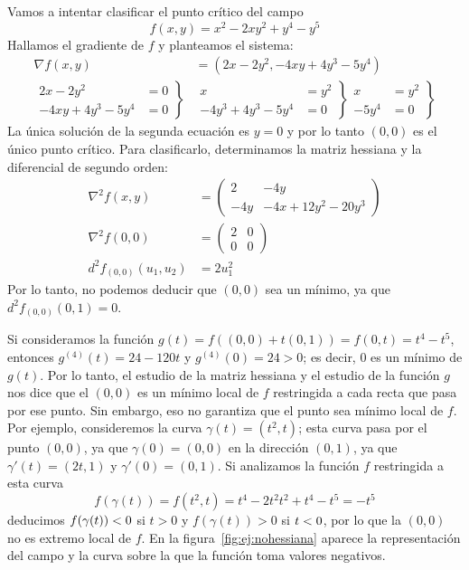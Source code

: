 \begin{ejemplo}\label{ej:nohessiana}
Vamos a intentar clasificar el punto crítico del campo
\[
f(x,y)=x^2-2xy^2+y^4-y^5
\]
Hallamos el gradiente de $f$ y planteamos el sistema:
\begin{align*}
\nabla f(x,y) & = (2x-2y^2,-4xy+4y^3-5y^4) \\[1em]
\left.\begin{array}{rl}
2x-2y^2 & = 0\\
-4xy+4y^3-5y^4 & =0 
\end{array}\right\} & 
\left.\begin{array}{rl}
x & = y^2\\
-4y^3+4y^3-5y^4 & =0
\end{array}\right\}
\left.\begin{array}{rl}
x & = y^2\\
-5y^4 & =0
\end{array}\right\}
\end{align*}
La única solución de la segunda ecuación es $y=0$ y por lo tanto $(0,0)$ es el único punto crítico.
Para clasificarlo, determinamos la matriz hessiana y la diferencial de segundo orden:
%
\begin{align*}
\nabla^2f(x,y) &=
\begin{pmatrix}
2 & -4y \\
-4y & -4x+12y^2-20y^3
\end{pmatrix}\\
\nabla^2f(0,0) &=
\begin{pmatrix}
2 & 0 \\
0 & 0
\end{pmatrix}\\
d^2f_{(0,0)}(u_1,u_2) &= 2u_1^2
\end{align*}
Por lo tanto, no podemos deducir que $(0,0)$ sea un mínimo, ya que
$d^2f_{(0,0)}(0,1)=0$.

Si consideramos la función $g(t)=f((0,0)+t(0,1))=f(0,t)=t^4-t^5$,
entonces $g^{(4)}(t)=24-120t$ y $g^{(4)}(0)=24>0$;
es decir, 0 es un mínimo de $g(t)$.
Por lo tanto, el estudio de la matriz hessiana y el estudio de la función $g$ nos dice que el
$(0,0)$ es un mínimo local de $f$ restringida a cada recta que pasa por ese punto.
Sin embargo, eso no garantiza que el punto sea mínimo local de $f$. Por ejemplo, consideremos la curva $\gamma(t)=(t^2,t)$; esta curva pasa por el punto $(0,0)$, ya que $\gamma(0)=(0,0)$ en la dirección $(0,1)$, ya que $\gamma'(t)=(2t,1)$ y $\gamma'(0)=(0,1)$.
Si analizamos la función $f$ restringida a esta curva
\[
f(\gamma(t))= f(t^2,t)=t^4-2t^2t^2+t^4-t^5=-t^5
\]
deducimos $f(\gamma(t))< 0$ si $t>0$ y $f(\gamma(t))>0$ si $t< 0$, por lo que la $(0,0)$ no es extremo local de $f$.
En la figura~\ref{fig:ej:nohessiana} aparece la representación del campo y la curva sobre la que la función toma valores negativos.\fej
\end{ejemplo}

